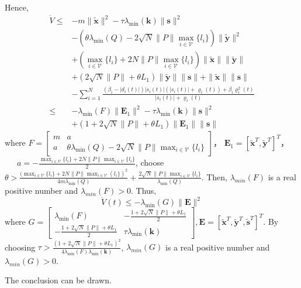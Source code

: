 \documentclass[12pt, a4paper, oneside]{ctexbook}
\begin{document}
Hence,
\begin{equation}
    \begin{aligned}
        \dot{V}\leq & -m\|\tilde{\mathbf{x}}\|^2-\tau\lambda_{\min}(\mathbf{k})\|\mathbf{s}\|^2                                                    \\
                    & -(\theta\lambda_{\min}(Q)-2\sqrt{N}\|P\|\max_{i\in\mathcal{V}}\{l_i\})\|\tilde{\mathbf{y}}\|^2                               \\
                    & +(\max_{i\in\mathcal{V}}\{l_i\}+2N\|P\|\max_{i\in\mathcal{V}}\{l_i\})\|\tilde{\mathbf{x}}\|\|\tilde{\mathbf{y}}\|            \\
                    & +(2\sqrt{N}\|P\|+\theta L_{1})\|\tilde{\mathbf{y}}\|\|\mathbf{s}\|+\|\tilde{\mathbf{x}}\|\|\mathbf{s}\|                      \\
                    & -\sum_{i = 1}^{N}\frac{(\beta_i - |d_i(t)|)|s_i(t)|(|s_i(t)|+\varrho_i(t)) + \beta_i\varrho_i^2(t)}{|s_i(t)| + \varrho_i(t)} \\
        \leq        & -\lambda_{\min}(F)\|\mathbf{E}_1\|^2-\tau\lambda_{\min}(\mathbf{k})\|\mathbf{s}\|^2                                          \\
                    & +(1+2\sqrt{N}\|P\|+\theta L_1)\|\mathbf{E}_1\|\|\mathbf{s}\|
    \end{aligned}
\end{equation}
where $\left.F=\left[\begin{array}{cc}m & a                                                                   \\
             a     & \theta\lambda_{\min}(Q)-2\sqrt{N}\|P\|\max_{i\in\mathcal{V}}\{l_i\}\end{array}\right.\right]$，
$\mathbf{E}_1 = [\tilde{\mathbf{x}}^T,\tilde{\mathbf{y}}^T]^T$，
~~~$a = -\frac{\max_{i\in\mathcal{V}}\{l_{i}\}+2N\|P\|\max_{i\in\mathcal{V}}\{l_{i}\}}{2}$, choose
$\theta > \frac{(\max_{i\in\mathcal{V}}\{l_{i}\}+2N\|P\|\max_{i\in\mathcal{V}}(l_{i}\})^{2}}{4m\lambda_{\mathrm{min}}(Q)}+\frac{2\sqrt{N}\|P\|\max_{i\in\mathcal{V}}\{l_{i}\}}{\lambda_{\mathrm{min}}(Q)}$. Then, $\lambda_{min}(F)$ is a real positive number and $\lambda_{min}(F) > 0$. Thus,
\begin{equation}
    \dot{V}(t) \leq -\lambda_{\min}(G)\|\mathbf{E}\|^2
\end{equation}
where $\left.G=\left[\begin{array}{cc}\lambda_{\min}(F)&-\frac{1+2\sqrt{N}\|P\|+\theta L_1}2\\-\frac{1+2\sqrt{N}\|P\|+\theta L_1}2&\tau\lambda_{\min}(\mathbf{k})\end{array}\right.\right],
    \mathbf{E} = [\tilde{\mathbf{x}}^T,\tilde{\mathbf{y}}^T,\tilde{\mathbf{s}}^T]^T$. By choosing
$\tau>\frac{(1+2\sqrt{N}\|P\|+\theta L_{1})^{2}}{4\lambda_{\mathrm{min}}(F)\lambda_{\mathrm{min}}(\mathbf{k})}$, $\lambda_{min}(G)$ is a real positive number and $\lambda_{min}(G) > 0$.

The conclusion can be drawn.
\end{document}
